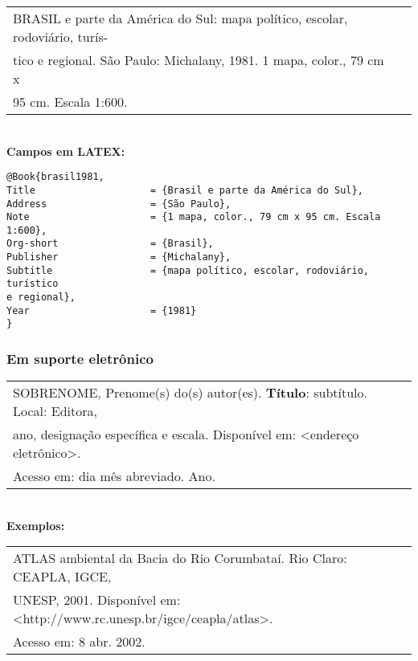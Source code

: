 \begin{tabular}{|l|c|} \hline
	BRASIL e parte da América do Sul: mapa político, escolar, rodoviário, 
	turís-                                                                  \\ 
	tico e regional. São Paulo: Michalany, 1981. 1 mapa, color., 79 cm x    \\
	95 cm. Escala 1:600.                                                     
	                                                                         \\\hline
\end{tabular} \\
	
\textbf{Campos em LATEX:} 
	
\begingroup
\fontsize{10pt}{12pt}\selectfont
\begin{verbatim}
@Book{brasil1981,
Title                    = {Brasil e parte da América do Sul},
Address                  = {São Paulo},
Note                     = {1 mapa, color., 79 cm x 95 cm. Escala 1:600},
Org-short                = {Brasil},
Publisher                = {Michalany},
Subtitle                 = {mapa político, escolar, rodoviário, turístico 
e regional},
Year                     = {1981}
}
\end{verbatim}
\endgroup
	
\subsubsection{Em suporte eletrônico}
	
\begin{tabular}{|l|c|} \hline
	SOBRENOME, Prenome(s) do(s) autor(es). \textbf{Título}: subtítulo. Local: Editora, \\
	ano, designação específica e escala. Disponível em: <endereço eletrônico>.     \\
	Acesso em: dia mês abreviado. Ano.                                                  
	                                                                                     \\\hline
\end{tabular} \\
	
\textbf{Exemplos:} \\
	
\begin{tabular}{|l|c|} \hline
	ATLAS ambiental da Bacia do Rio Corumbataí. Rio Claro: CEAPLA, IGCE,    \\
	UNESP, 2001. Disponível em: <http://www.rc.unesp.br/igce/ceapla/atlas>. \\
	Acesso em: 8 abr. 2002.                                                  
	                                                                         \\\hline
\end{tabular} \\
	
